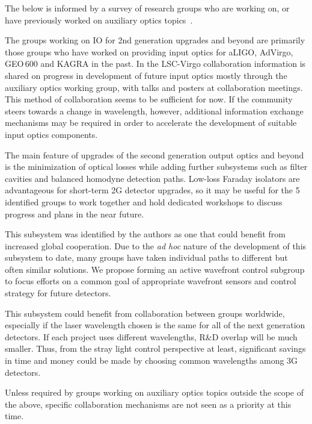 The below is informed by a survey of research groups who are working on, or have previously worked on auxiliary optics topics~\cite{AuxActivitiesTable}.

 The groups working on IO for 2nd generation upgrades and beyond are primarily those groups who have worked on providing input optics for aLIGO, AdVirgo, GEO\,600 and KAGRA in the past. In the LSC-Virgo collaboration information is shared on progress in development of future input optics mostly through the auxiliary optics working group, with talks and posters at collaboration meetings. This method of collaboration seems to be sufficient for now. If the community steers towards a change in wavelength, however, additional information exchange mechanisms may be required in order to accelerate the development of suitable input optics components.

 The main feature of upgrades of the second generation output optics and beyond is the minimization of optical losses while adding further subsystems such as filter cavities and balanced homodyne detection paths. 
Low-loss Faraday isolators are advantageous for short-term 2G detector upgrades, so it may be useful for the 5 identified groups to work together and hold dedicated workshops to discuss progress and plans in the near future. 

This subsystem was identified by the authors as one that could benefit from increased global cooperation. Due to the \emph{ad hoc} nature of the development of this subsystem to date, many groups have taken individual paths to different but often similar solutions. We propose forming an active wavefront control subgroup to focus efforts on a common goal of appropriate wavefront sensors and control strategy for future detectors. 

 This subsystem could benefit from collaboration between groups worldwide, especially if the laser wavelength chosen is the same for all of the next generation detectors. If each project uses different wavelengths, R\&D overlap will be much smaller. 
Thus, from the stray light control perspective at least, significant savings in time and money could be made by choosing common wavelengths among 3G detectors. 

 Unless required by groups working on auxiliary optics topics outside the scope of the above, specific collaboration mechanisms are not seen as a priority at this time. 

